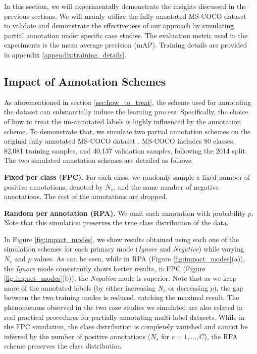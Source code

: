 \label{experiments}
In this section, we will experimentally demonstrate the insights discussed in the previous sections. We will mainly utilize the fully annotated MS-COCO dataset \cite{lin2014microsoft} to validate and demonstrate the effectiveness of our approach by simulating partial annotation under specific case studies. The evaluation metric used in the experiments is the mean average precision (mAP). Training details are provided in appendix \ref{appendix:training_details}.


\subsection{Impact of Annotation Schemes}
\label{sec:annotation_schemes}
As aforementioned in section \ref{sec:how_to_treat}, the scheme used for annotating the dataset can substantially induce the learning process. Specifically, the choice of how to treat the un-annotated labels is highly influenced by the annotation scheme. To demonstrate that, we simulate two partial annotation schemes on the original fully annotated MS-COCO dataset \cite{lin2014microsoft}. 
MS-COCO includes 80 classes, 82,081 training samples, and 40,137 validation samples, following the 2014 split. The two simulated annotation schemes are detailed as follows:



\noindent\textbf{Fixed per class (FPC).} 
For each class, we randomly sample a fixed number of positive annotations, denoted by $N_s$, and the same number of negative annotations. The rest of the annotations are dropped. 


\noindent\textbf{Random per annotation (RPA).}
We omit each annotation with probability $p$. Note that this simulation preserves the true class distribution of the data. 

In Figure \ref{fig:impact_modes}, we show results obtained using each one of the simulation schemes for each primary mode (\textit{Ignore} and \textit{Negative}) while varying $N_s$ and $p$ values. As can be seen, while in RPA (Figure \ref{fig:impact_modes}(a)), the \textit{Ignore} mode consistently shows better results, in FPC (Figure \ref{fig:impact_modes}(b)), the \textit{Negative} mode is superior. 
Note that as we keep more of the annotated labels (by either increasing $N_s$ or decreasing $p$), the gap between the two training modes is reduced, catching the maximal result.
The phenomenons observed in the two case studies we simulated are also related in real practical procedures for partially annotating multi-label datasets. While in the FPC simulation, the class distribution is completely vanished and cannot be inferred by the number of positive annotations ($N_s$ for  $c=1,..., C$), the RPA scheme preserves the class distribution. 


